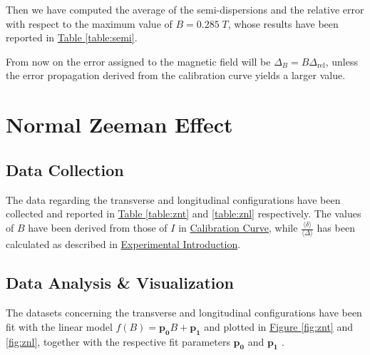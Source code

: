 \documentclass[a4paper,12pt,abstracton]{scrartcl}
\begin{document}
Then we have computed the average of the semi-dispersions and the relative error with respect to the maximum value of $B=0.285\;T$, whose results have been reported in \hyperref[table:semi]{ Table \ref*{table:semi}}.

\begin{table}[H]
\centering
\caption{}
\label{table:semi}
\end{table}

From now on the error assigned to the magnetic field will be $\Delta_B=B\Delta_{\text{rel}}$, unless the error propagation derived from the calibration curve yields a larger value. 

\clearpage

\section{Normal Zeeman Effect}

\subsection{Data Collection}

The data regarding the transverse and longitudinal configurations have been collected and reported in \hyperref[table:znt]{Table \ref*{table:znt}} and \hyperref[table:znl]{ \ref*{table:znl}} respectively. The values of $B$ have been derived from those of $I$ in \hyperref[sec:cal]{Calibration Curve}, while $\frac{\langle \delta \rangle}{\langle \Delta \rangle}$ has been calculated as described in \hyperref[sec:ExpIntro]{Experimental Introduction}.

\subsection{Data Analysis \& Visualization}

The datasets concerning the transverse and longitudinal configurations have been fit with the linear model $f(B)=\boldsymbol{p_0}B+\boldsymbol{p_1}$ and plotted in \hyperref[fig:znt]{Figure \ref*{fig:znt}} and \hyperref[fig:znl]{ \ref*{fig:znl}}, together with the respective fit parameters $\boldsymbol{p_0}$ and  $\boldsymbol{p_1}$ .
\end{document}
